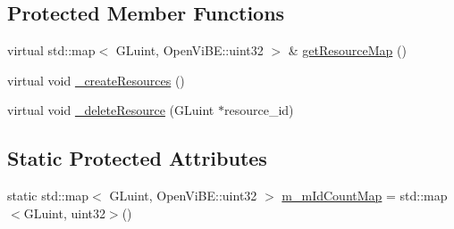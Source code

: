 \subsection*{Protected Member Functions}
\begin{DoxyCompactItemize}
\item 
virtual std::map$<$ GLuint, OpenViBE::uint32 $>$ \& \hyperlink{classOpenViBEApplications_1_1OpenGLVBOManager_a96ea877a37aa1fccf4922e309c5b6c3b}{getResourceMap} ()
\item 
virtual void \hyperlink{classOpenViBEApplications_1_1OpenGLVBOManager_a95c5e8ff754e1f737912109ee0842cc8}{\_\-createResources} ()
\item 
virtual void \hyperlink{classOpenViBEApplications_1_1OpenGLVBOManager_a8a45fdbd15919aa3ae2042072feedcc8}{\_\-deleteResource} (GLuint $\ast$resource\_\-id)
\end{DoxyCompactItemize}
\subsection*{Static Protected Attributes}
\begin{DoxyCompactItemize}
\item 
static std::map$<$ GLuint, OpenViBE::uint32 $>$ \hyperlink{classOpenViBEApplications_1_1OpenGLVBOManager_acfb996b9b393aa341efa02034e26c37c}{m\_\-mIdCountMap} = std::map$<$GLuint, uint32$>$()
\end{DoxyCompactItemize}


